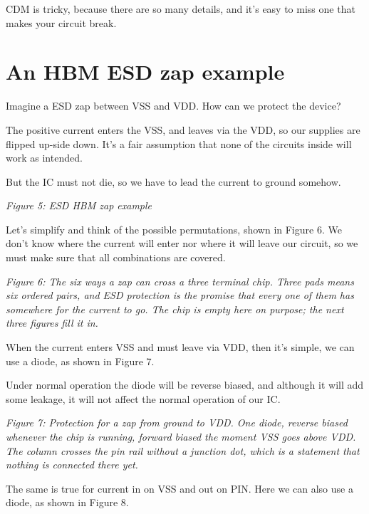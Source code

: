 CDM is tricky, because there are so many details, and it's easy to miss
one that makes your circuit break.

\section{An HBM ESD zap example}\label{an-hbm-esd-zap-example}

Imagine a ESD zap between VSS and VDD. How can we protect the device?

The positive current enters the VSS, and leaves via the VDD, so our
supplies are flipped up-side down. It's a fair assumption that none of
the circuits inside will work as intended.

But the IC must not die, so we have to lead the current to ground
somehow.


{
\centering
{}
}

\emph{Figure 5: ESD HBM zap example }

Let's simplify and think of the possible permutations, shown in Figure
6. We don't know where the current will enter nor where it will leave
our circuit, so we must make sure that all combinations are covered.


{
\centering
{}
}

\emph{Figure 6: The six ways a zap can cross a three terminal chip.
Three pads means six ordered pairs, and ESD protection is the promise
that every one of them has somewhere for the current to go. The chip is
empty here on purpose; the next three figures fill it in.}

When the current enters VSS and must leave via VDD, then it's simple, we
can use a diode, as shown in Figure 7.

Under normal operation the diode will be reverse biased, and although it
will add some leakage, it will not affect the normal operation of our
IC.


{
\centering
{}
}

\emph{Figure 7: Protection for a zap from ground to VDD. One diode,
reverse biased whenever the chip is running, forward biased the moment
VSS goes above VDD. The column crosses the pin rail without a junction
dot, which is a statement that nothing is connected there yet.}

The same is true for current in on VSS and out on PIN. Here we can also
use a diode, as shown in Figure 8.



